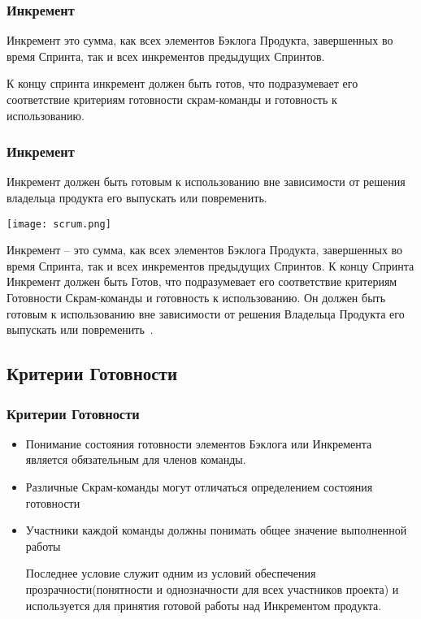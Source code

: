 \documentclass{../industrial-development}
\begin{document}
\begin{frame} \frametitle {Инкремент}
\begin {block}{Инкремент}
это сумма, как всех элементов Бэклога Продукта, завершенных во время
Спринта, так и всех инкрементов предыдущих Спринтов.
\end{block} 
К концу спринта инкремент должен быть готов, что подразумевает его соответствие
критериям готовности скрам‐команды и готовность к использованию.
\end {frame}

\begin{frame} \frametitle{Инкремент}
Инкремент должен быть готовым к использованию вне зависимости от решения владельца продукта его выпускать или повременить.
\centerline{\texttt{[image: scrum.png]}}
\end{frame} 
\lecturenotes
Инкремент – это сумма, как всех элементов Бэклога Продукта, завершенных во время
Спринта, так и всех инкрементов предыдущих Спринтов.
К концу Спринта Инкремент должен быть Готов, что подразумевает его соответствие
критериям Готовности Скрам‐команды и готовность к использованию. Он должен быть готовым к использованию вне зависимости от решения Владельца Продукта его выпускать или повременить~\cite{Scrum}.


\subsection{Критерии Готовности}

\begin{frame} \frametitle {Критерии Готовности}

\begin{itemize}
	\item Понимание состояния готовности элементов Бэклога или Инкремента является
обязательным для членов команды. 
  \item Различные Скрам‐команды могут отличаться определением состояния готовности
 \item Участники каждой команды должны понимать общее значение выполненной работы
\begin{block}{}
Последнее условие служит одним из условий обеспечения \alert{прозрачности}(понятности и однозначности для всех участников проекта) и используется для принятия готовой работы над \alert{Инкрементом продукта}.
\end{block}
\end{itemize}
\end {frame}
\end{document}
